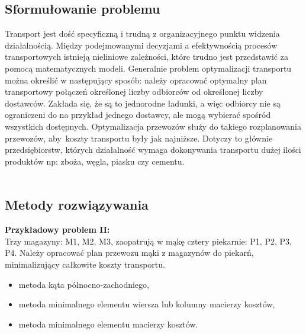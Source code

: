 \documentclass[10pt, a
4paper]{article}
\begin{document}
\subsection{Sformułowanie problemu}
Transport jest dość specyficzną i trudną z organizacyjnego punktu widzenia działalnością. Między podejmowanymi decyzjami a efektywnością procesów transportowych istnieją nieliniowe zależności, które trudno jest przedstawić za pomocą matematycznych modeli. Generalnie problem optymalizacji transportu można określić w następujący sposób: należy opracować optymalny plan transportowy połączeń określonej liczby odbiorców od określonej liczby dostawców. Zakłada się, że są to jednorodne ładunki, a więc odbiorcy nie są
ograniczeni do na przykład jednego dostawcy, ale mogą wybierać spośród wszystkich dostępnych. Optymalizacja przewozów służy do takiego rozplanowania przewozów, aby~koszty transportu były jak najniższe. Dotyczy to głównie przedsiębiorstw, których działalność wymaga dokonywania transportu dużej ilości produktów np: zboża, węgla, piasku czy cementu.\\\\
\subsection{Metody rozwiązywania}

\textbf{Przykładowy problem II:}\\
Trzy magazyny: M1, M2, M3, zaopatrują w mąkę cztery piekarnie: P1, P2, P3, P4.
Należy opracować plan przewozu mąki z magazynów do piekarń, minimalizujący całkowite koszty transportu.

\begin{itemize}
\item metoda kąta północno-zachodniego,
\item metoda minimalnego elementu wiersza lub kolumny macierzy kosztów,
\item metoda minimalnego elementu macierzy kosztów.
\end{itemize}
\end{document}
